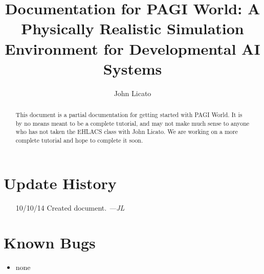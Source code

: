 \documentclass[11pt]{article}
\begin{document}
\title{Documentation for PAGI World: A Physically Realistic Simulation Environment for Developmental AI Systems}
\author{John Licato}
\maketitle

\begin{abstract}
This document is a partial documentation for getting started with PAGI World. It is by no means meant to be a complete tutorial, and may not make much sense to anyone who has not taken the EHLACS class with John Licato. We are working on a more complete tutorial and hope to complete it soon.
\end{abstract}

\tableofcontents

\section*{Update History}

\begin{itemize}
\item[10/10/14] Created document. \textit{---JL}
\end{itemize}

\section*{Known Bugs}

\begin{itemize}
\item none
\end{itemize}

\pagebreak
\end{document}
